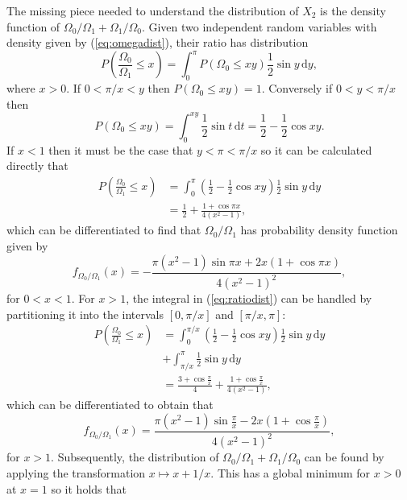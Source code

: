 \documentclass[nofootinbib,prb,amsmath,amssymb,twocolumn,floatfix]{revtex4-2}
\theoremstyle{definition}
\newcommand{\de}{\,\mathrm{d}}
\begin{document}
The missing piece needed to understand the distribution of $X_2$ is the density function of $\Omega_0/\Omega_1 + \Omega_1/\Omega_0$. Given two independent random variables with density given by (\ref{eq:omegadist}), their ratio has distribution
\begin{equation} \label{eq:ratiodist}
	P\left(\frac{\Omega_0}{\Omega_1}\leq x\right) = \int_0^\pi P(\Omega_0\leq xy) \frac{1}{2}\sin y \de y,
\end{equation}
where $x>0$. If $0<\pi/x<y$ then $P(\Omega_0\leq xy)=1$. Conversely if $0<y<\pi/x$ then 
\begin{equation} \label{eq:distcalc}
	P(\Omega_0\leq xy) = \int_0^{xy} \frac{1}{2} \sin t \de t = \frac{1}{2}-\frac{1}{2}\cos xy.
\end{equation}
If $x<1$ then it must be the case that $y<\pi<\pi/x$ so it can be calculated directly that
\begin{align} \label{eq:ratioCDF1}
	P\left(\frac{\Omega_0}{\Omega_1}\leq x\right) &= \int_0^\pi \left( \frac{1}{2}-\frac{1}{2}\cos xy \right) \frac{1}{2}\sin y \de y  \nonumber \\&=\frac{1}{2}+\frac{1+\cos\pi x}{4(x^2-1)},
\end{align}
which can be differentiated to find that $\Omega_0/\Omega_1$ has probability density function given by
\begin{equation*}
	f_{\Omega_0/\Omega_1}(x)=-\frac{\pi(x^2-1)\sin\pi x+2x(1+\cos\pi x)}{4(x^2-1)^2},
\end{equation*}
for $0<x<1$. For $x>1$, the integral in (\ref{eq:ratiodist}) can be handled by partitioning it into the intervals $[0,\pi/x]$ and $[\pi/x,\pi]$:
\begin{eqnarray} \label{eq:ratioCDF2}
	P\left(\frac{\Omega_0}{\Omega_1}\leq x\right) &= \int_0^{\pi/x} \left( \frac{1}{2}-\frac{1}{2}\cos xy \right)\frac{1}{2}\sin y \de y \nonumber \\
	&+ \int_{\pi/x}^\pi \frac{1}{2}\sin y \de y \nonumber \\
	& = \frac{3+\cos\frac{\pi}{x}}{4} + \frac{1+\cos\frac{\pi}{x}}{4(x^2-1)},
\end{eqnarray}
which can be differentiated to obtain that
\begin{equation}
	f_{\Omega_0/\Omega_1}(x)=\frac{\pi(x^2-1)\sin\frac{\pi}{x}-2x(1+\cos\frac{\pi}{x})}{4(x^2-1)^2},
\end{equation}
for $x>1$. Subsequently, the distribution of $\Omega_0/\Omega_1 + \Omega_1/\Omega_0$ can be found by applying the transformation $x\mapsto x+1/x$. This has a global minimum for $x>0$ at $x=1$ so it holds that
\end{document}
